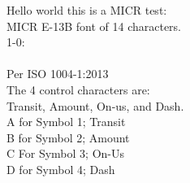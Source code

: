 \documentclass{article}
\begin{document}
Hello world this is a MICR test:
\\
MICR E-13B font of 14 characters. \\
1-0:\\
\\
Per ISO 1004-1:2013\\
The 4 control characters are:\\
Transit, Amount,  On-us, and Dash.\\
A for Symbol 1; Transit \\
B for Symbol 2; Amount \\
C For Symbol 3; On-Us \\
D for Symbol 4; Dash \\
\end{document}
